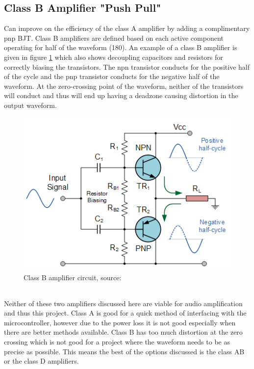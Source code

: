 \documentclass[12pt, a4paper]{article}
\begin{document}
\subsection*{Class B Amplifier "Push Pull"}
Can improve on the efficiency of the class A amplifier by adding a complimentary pnp BJT. Class B amplifiers are defined based on each active component operating for half of the waveform (180\degree).  An example of a class B amplifier is given in figure \ref{fig:classBAmplifier} which also shows decoupling capacitors and resistors for correctly biasing the transistors. The npn transistor conducts for the positive half of the cycle and the pnp transistor conducts for the negative half of the waveform. At the zero-crossing point of the waveform, neither of the transistors will conduct and thus will end up having a deadzone causing distortion in the output waveform. \\
\begin{figure} [!htb]
	\hfill\includegraphics{./Figures/class_B_amplifier_biasing}\hspace*{\fill}	
	\caption{Class B amplifier circuit, source: \cite{amplifiers}}
	\label{fig:classBAmplifier}
\end{figure}\\
Neither of these two amplifiers discussed here are viable for audio amplification and thus this project. Class A is good for a quick method of interfacing with the microcontroller, however due to the power loss it is not good especially when there are better methods available. Class B has too much distortion at the zero crossing which is not good for a project where the waveform needs to be as precise as possible. This means the best of the options discussed is the class AB or the class D amplifiers.\\
\end{document}
